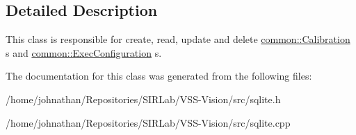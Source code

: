 \subsection{Detailed Description}
This class is responsible for create, read, update and delete \hyperlink{structcommon_1_1Calibration}{common\+::\+Calibration} \textquotesingle{}s and \hyperlink{structcommon_1_1ExecConfiguration}{common\+::\+Exec\+Configuration} \textquotesingle{}s. 

The documentation for this class was generated from the following files\+:\begin{DoxyCompactItemize}
\item 
/home/johnathan/\+Repositories/\+S\+I\+R\+Lab/\+V\+S\+S-\/\+Vision/src/sqlite.\+h\item 
/home/johnathan/\+Repositories/\+S\+I\+R\+Lab/\+V\+S\+S-\/\+Vision/src/sqlite.\+cpp\end{DoxyCompactItemize}
